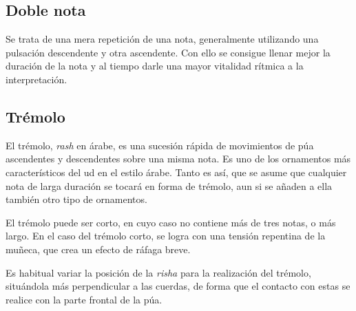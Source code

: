 

\subsection{Doble nota}

Se trata de una mera repetición de una nota, generalmente utilizando una pulsación descendente y otra ascendente. Con ello se consigue llenar mejor la duración de la nota y al tiempo darle una mayor vitalidad rítmica a la interpretación.

\begin{center}
\end{center}


\subsection{Trémolo}

El trémolo, \emph{rash} en árabe, es una sucesión rápida de movimientos de púa ascendentes y descendentes sobre una misma nota. Es uno de los ornamentos más característicos del ud en el estilo árabe. Tanto es así, que se asume que cualquier nota de larga duración se tocará en forma de trémolo, aun si se añaden a ella también otro tipo de ornamentos.

El trémolo puede ser corto, en cuyo caso no contiene más de tres notas, o más largo. En el caso del trémolo corto, se logra con una tensión repentina de la muñeca, que crea un efecto de ráfaga breve.

Es habitual variar la posición de la \emph{risha} para la realización del trémolo, situándola más perpendicular a las cuerdas, de forma que el contacto con estas se realice con la parte frontal de la púa.

